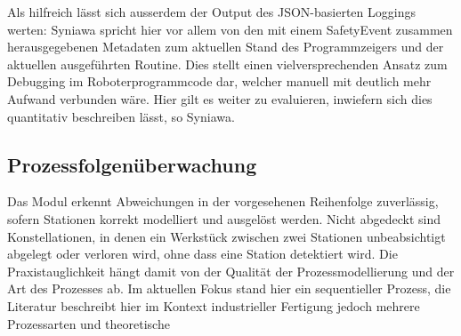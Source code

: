 Als hilfreich lässt sich ausserdem der Output des JSON-basierten Loggings
werten: Syniawa spricht hier vor allem von den mit einem SafetyEvent zusammen
herausgegebenen Metadaten zum aktuellen Stand des Programmzeigers und
der aktuellen
ausgeführten Routine. Dies stellt einen vielversprechenden Ansatz zum Debugging
im Roboterprogrammcode dar, welcher manuell mit deutlich mehr Aufwand verbunden
wäre. Hier gilt es weiter zu evaluieren, inwiefern sich dies quantitativ
beschreiben lässt, so Syniawa.

\subsection{Prozessfolgenüberwachung}

Das Modul erkennt Abweichungen in der vorgesehenen Reihenfolge zuverlässig,
sofern Stationen korrekt modelliert und ausgelöst werden. Nicht abgedeckt sind
Konstellationen, in denen ein Werkstück zwischen zwei Stationen
unbeabsichtigt abgelegt oder verloren wird, ohne dass eine Station detektiert
wird. Die Praxistauglichkeit hängt damit von der Qualität der
Prozessmodellierung und der Art des Prozesses ab. Im aktuellen Fokus stand hier
ein sequentieller Prozess, die Literatur beschreibt hier im Kontext
industrieller Fertigung jedoch mehrere Prozessarten und theoretische
